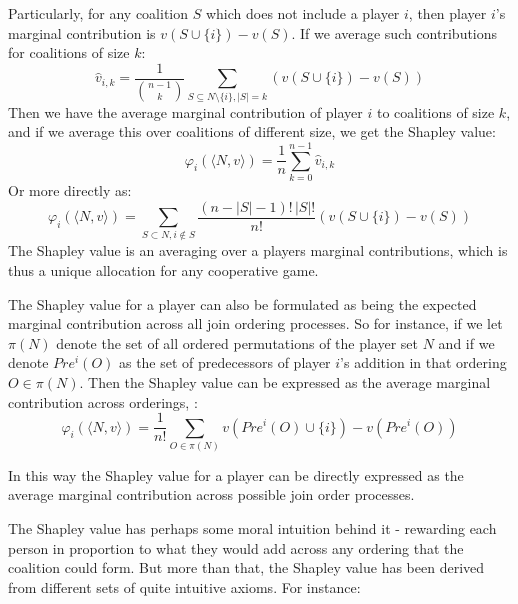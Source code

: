 Particularly, for any coalition $S$ which does not include a player $i$, then player $i$'s marginal contribution is $v(S\cup\{i\}) - v(S)$. If we average such contributions for coalitions of size $k$:
\begin{equation}\label{eq:shapley_value2}
\hat{v}_{i,k} = \frac{1}{\binom{n-1}{k}}\sum_{S\subseteq N\setminus \{ i\} , |S|=k} %
(v(S\cup\{i\})-v(S))
\end{equation}
Then we have the average marginal contribution of player $i$ to coalitions of size $k$, and if we average this over coalitions of different size, we get the Shapley value:
\begin{equation}\label{shap2} \varphi_i(\langle N,v\rangle) = \frac{1}{n}\sum_{k=0}^{n-1}\hat{v}_{i,k} \end{equation}
Or more directly as:
\begin{equation}\label{shap1_X}\varphi_i(\langle N,v\rangle) = \sum_{S\subset N, i\notin S}\frac{(n-|S|-1)!\,|S|!}{n!}(v(S\cup\{i\})-v(S))\end{equation}
The Shapley value is an averaging over a players marginal contributions, which is thus a unique allocation for any cooperative game.

The Shapley value for a player can also be formulated as being the expected marginal contribution across all join ordering processes.
So for instance, if we let $\pi(N)$ denote the set of all ordered permutations of the player set $N$ and if we denote $Pre^i(O)$ as the set of predecessors of player $i$'s addition in that ordering $O\in \pi(N)$. Then the Shapley value can be expressed as the average marginal contribution across orderings, \cite{weber_1988}:
\begin{equation}\label{shapley_value3}
    \varphi_i(\langle N,v\rangle) = \frac{1}{n!}\sum_{O\in\pi(N)}v(Pre^i(O)\cup\{i\})-v(Pre^i(O))
\end{equation}

In this way the Shapley value for a player can be directly expressed as the average marginal contribution across possible join order processes.

The Shapley value has perhaps some moral intuition behind it - rewarding each person in proportion to what they would add across any ordering that the coalition could form.
But more than that, the Shapley value has been derived from different sets of quite intuitive axioms.
For instance:

